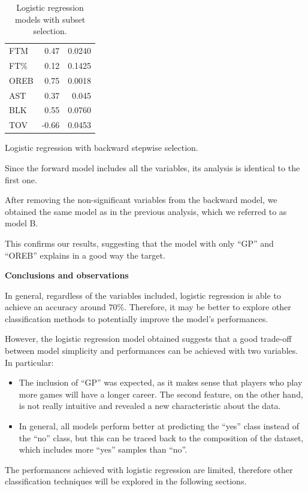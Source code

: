 \begin{table}[H]
\begin{subtable}[h]{0.3\textwidth}
\begin{tabular}{|| l | r | r ||}
			FTM & 0.47 & 0.0240 \\
			FT\% & 0.12 & 0.1425 \\
			OREB & 0.75 & 0.0018 \\
			AST & 0.37 & 0.045 \\
			BLK & 0.55 & 0.0760 \\				
			TOV & -0.66 & 0.0453 \\
			\hline
		\end{tabular}
		\caption{Logistic regression with backward stepwise selection.}
		\label{table:LRBSSum}
	\end{subtable}
	\caption{Logistic regression models with subset selection.}
	\label{table:LRSSum}
\end{table}

Since the forward model includes all the variables, its analysis is identical to the first one.

After removing the non-significant variables from the backward model, we obtained the same model as in the previous analysis, which we referred to as model B. 

This confirms our results, suggesting that the model with only ``GP'' and ``OREB'' explains in a good way the target. 

\vspace{0.2cm}
\textbf{Conclusions and observations}

In general, regardless of the variables included, logistic regression is able to achieve an accuracy around $70\%$. Therefore, it may be better to explore other classification methods to potentially improve the model's performances.

However, the logistic regression model obtained suggests that a good trade-off between model simplicity and performances can be achieved with two variables. In particular:

\begin{itemize}
	\item The inclusion of ``GP'' was expected, as it makes sense that players who play more games will have a longer career. The second feature, on the other hand, is not really intuitive and revealed a new characteristic about the data.
	\item In general, all models perform better at predicting the ``yes'' class instead of the ``no'' class, but this can be traced back to the composition of the dataset, which includes more ``yes'' samples than ``no''.
\end{itemize}

The performances achieved with logistic regression are limited, therefore other classification techniques will be explored in the following sections.
